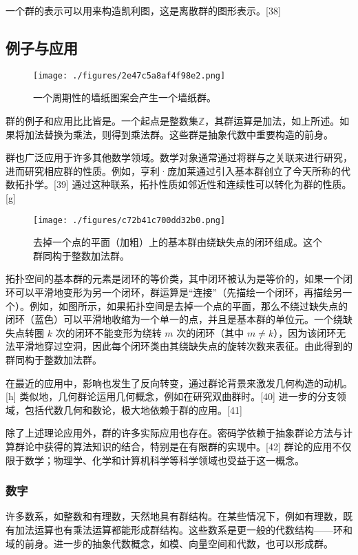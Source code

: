 一个群的表示可以用来构造凯利图，这是离散群的图形表示。[38]
\subsection{例子与应用}
\begin{figure}[ht]
\centering
\texttt{[image: ./figures/2e47c5a8af4f98e2.png]}
\caption{一个周期性的墙纸图案会产生一个墙纸群。} \label{fig_GroupM_3}
\end{figure}
群的例子和应用比比皆是。一个起点是整数集\( \mathbb{Z} \)，其群运算是加法，如上所述。如果将加法替换为乘法，则得到乘法群。这些群是抽象代数中重要构造的前身。

群也广泛应用于许多其他数学领域。数学对象通常通过将群与之关联来进行研究，进而研究相应群的性质。例如，亨利·庞加莱通过引入基本群创立了今天所称的代数拓扑学。[39] 通过这种联系，拓扑性质如邻近性和连续性可以转化为群的性质。[g]
\begin{figure}[ht]
\centering
\texttt{[image: ./figures/c72b41c700dd32b0.png]}
\caption{去掉一个点的平面（加粗）上的基本群由绕缺失点的闭环组成。这个群同构于整数加法群。} \label{fig_GroupM_4}
\end{figure}
拓扑空间的基本群的元素是闭环的等价类，其中闭环被认为是等价的，如果一个闭环可以平滑地变形为另一个闭环，群运算是“连接”（先描绘一个闭环，再描绘另一个）。例如，如图所示，如果拓扑空间是去掉一个点的平面，那么不绕过缺失点的闭环（蓝色）可以平滑地收缩为一个单一的点，并且是基本群的单位元。一个绕缺失点转圈 \( k \) 次的闭环不能变形为绕转 \( m \) 次的闭环（其中 \( m \neq k \)），因为该闭环无法平滑地穿过空洞，因此每个闭环类由其绕缺失点的旋转次数来表征。由此得到的群同构于整数加法群。

在最近的应用中，影响也发生了反向转变，通过群论背景来激发几何构造的动机。[h] 类似地，几何群论运用几何概念，例如在研究双曲群时。[40] 进一步的分支领域，包括代数几何和数论，极大地依赖于群的应用。[41]

除了上述理论应用外，群的许多实际应用也存在。密码学依赖于抽象群论方法与计算群论中获得的算法知识的结合，特别是在有限群的实现中。[42] 群论的应用不仅限于数学；物理学、化学和计算机科学等科学领域也受益于这一概念。
\subsubsection{数字}  
许多数系，如整数和有理数，天然地具有群结构。在某些情况下，例如有理数，既有加法运算也有乘法运算都能形成群结构。这些数系是更一般的代数结构——环和域的前身。进一步的抽象代数概念，如模、向量空间和代数，也可以形成群。

